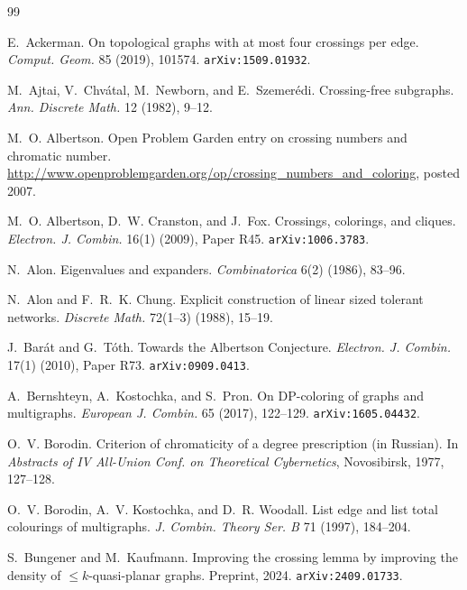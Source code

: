 \documentclass[11pt,a4paper]{article}
\theoremstyle{definition}
\begin{document}
\begin{thebibliography}{99}

E.~Ackerman.
\newblock On topological graphs with at most four crossings per edge.
\newblock \emph{Comput. Geom.} 85 (2019), 101574.
\newblock \texttt{arXiv:1509.01932}.

M.~Ajtai, V.~Chv\'atal, M.~Newborn, and E.~Szemer\'edi.
\newblock Crossing-free subgraphs.
\newblock \emph{Ann. Discrete Math.} 12 (1982), 9--12.

M.~O. Albertson.
\newblock Open Problem Garden entry on crossing numbers and chromatic number.
\newblock \url{http://www.openproblemgarden.org/op/crossing_numbers_and_coloring},
posted 2007.

M.~O. Albertson, D.~W. Cranston, and J.~Fox.
\newblock Crossings, colorings, and cliques.
\newblock \emph{Electron. J. Combin.} 16(1) (2009), Paper R45.
\newblock \texttt{arXiv:1006.3783}.

N.~Alon.
\newblock Eigenvalues and expanders.
\newblock \emph{Combinatorica} 6(2) (1986), 83--96.

N.~Alon and F.~R.~K. Chung.
\newblock Explicit construction of linear sized tolerant networks.
\newblock \emph{Discrete Math.} 72(1--3) (1988), 15--19.

J.~Bar\'at and G.~T\'oth.
\newblock Towards the Albertson Conjecture.
\newblock \emph{Electron. J. Combin.} 17(1) (2010), Paper R73.
\newblock \texttt{arXiv:0909.0413}.

A.~Bernshteyn, A.~Kostochka, and S.~Pron.
\newblock On DP-coloring of graphs and multigraphs.
\newblock \emph{European J. Combin.} 65 (2017), 122--129.
\newblock \texttt{arXiv:1605.04432}.

O.~V. Borodin.
\newblock Criterion of chromaticity of a degree prescription (in Russian).
\newblock In \emph{Abstracts of IV All-Union Conf. on Theoretical
Cybernetics}, Novosibirsk, 1977, 127--128.

O.~V. Borodin, A.~V. Kostochka, and D.~R. Woodall.
\newblock List edge and list total colourings of multigraphs.
\newblock \emph{J. Combin. Theory Ser. B} 71 (1997), 184--204.

S.~Bungener and M.~Kaufmann.
\newblock Improving the crossing lemma by improving the
density of $\le k$-quasi-planar graphs.
\newblock Preprint, 2024.
\newblock \texttt{arXiv:2409.01733}.


\end{thebibliography}
\end{document}
